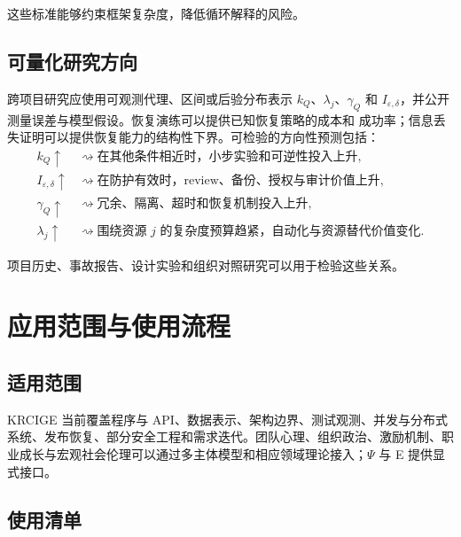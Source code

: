 \documentclass[11pt,a4paper]{ctexart}
\numberwithin{equation}{section}
\theoremstyle{definition}
\theoremstyle{plain}
\begin{document}
这些标准能够约束框架复杂度，降低循环解释的风险。

\subsection{可量化研究方向}

跨项目研究应使用可观测代理、区间或后验分布表示 $k_Q$、$\lambda_j$、$\gamma_Q$ 和
$I_{\varepsilon,\delta}$，并公开测量误差与模型假设。恢复演练可以提供已知恢复策略的成本和
成功率；信息丢失证明可以提供恢复能力的结构性下界。可检验的方向性预测包括：
\begin{align}
k_Q\uparrow &\rightsquigarrow \text{在其他条件相近时，小步实验和可逆性投入上升},\\
I_{\varepsilon,\delta}\uparrow &\rightsquigarrow \text{在防护有效时，review、备份、授权与审计价值上升},\\
\gamma_Q\uparrow &\rightsquigarrow \text{冗余、隔离、超时和恢复机制投入上升},\\
\lambda_j\uparrow &\rightsquigarrow \text{围绕资源 $j$ 的复杂度预算趋紧，自动化与资源替代价值变化}.
\end{align}

项目历史、事故报告、设计实验和组织对照研究可以用于检验这些关系。

\section{应用范围与使用流程}

\subsection{适用范围}
KRCIGE 当前覆盖程序与 API、数据表示、架构边界、测试观测、并发与分布式系统、发布恢复、部分安全工程和需求迭代。团队心理、组织政治、激励机制、职业成长与宏观社会伦理可以通过多主体模型和相应领域理论接入；$\Psi$ 与 E 提供显式接口。

\subsection{使用清单}
\end{document}
